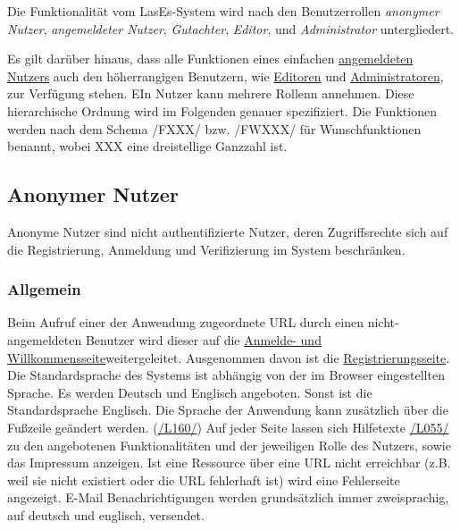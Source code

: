 

Die Funktionalität vom LasEs-System wird nach den Benutzerrollen
\textit{anonymer Nutzer}, \textit{angemeldeter Nutzer}, \textit{Gutachter}, \textit{Editor}, und
\textit{Administrator} untergliedert.

Es gilt darüber hinaus, dass alle Funktionen eines einfachen \hyperref[glo:regnutzer]{angemeldeten Nutzers} auch den höherrangigen Benutzern, wie
\hyperref[glo:editor]{Editoren} und \hyperref[glo:admin]{Administratoren}, zur Verfügung stehen. EIn Nutzer kann mehrere Rollenn annehmen.
Diese hierarchische Ordnung wird im Folgenden genauer spezifiziert.
Die Funktionen werden nach dem Schema /FXXX/ bzw. /FWXXX/ für Wunschfunktionen benannt, wobei XXX eine dreistellige Ganzzahl ist.

\subsection{Anonymer Nutzer}\label{funkt:nutzer}
Anonyme Nutzer sind nicht authentifizierte Nutzer, deren Zugriffsrechte sich
auf die Registrierung, Anmeldung und Verifizierung im System beschränken.

\subsubsection{Allgemein}
\begin{description}
     Beim Aufruf einer der Anwendung zugeordnete URL durch einen nicht-angemeldeten Benutzer
    wird dieser auf die \hyperref[an:log]{Anmelde- und Willkommensseite}weitergeleitet. Ausgenommen davon ist die \hyperref[an:reg]{Registrierungsseite}.
     Die Standardsprache des Systems ist abhängig von der im Browser
    eingestellten Sprache. Es werden Deutsch und Englisch angeboten.
    Sonst ist die Standardsprache Englisch. Die Sprache der Anwendung kann zusätzlich über die
    Fußzeile geändert werden. (\hyperref[leist:160]{/L160/})
     Auf jeder Seite lassen sich
    Hilfetexte \hyperref[leist:055]{/L055/} zu den angebotenen Funktionalitäten und der jeweiligen Rolle
    des Nutzers, sowie das Impressum anzeigen.
     Ist eine Ressource über eine URL nicht erreichbar (z.B. weil sie nicht existiert oder
     die URL fehlerhaft ist) wird eine Fehlerseite angezeigt.
     E-Mail Benachrichtigungen werden grundsätzlich immer zweisprachig,
    auf deutsch und englisch, versendet.
\end{description}

